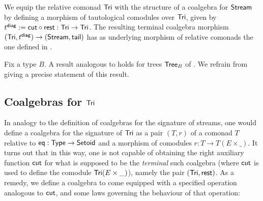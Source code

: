 \documentclass[envcountsame]{llncs}
\begin{document}
\begin{example}
  We equip the relative comonad $\mathsf{Tri}$ with the structure of a coalgebra for $\mathsf{Stream}$ by defining a 
  morphism of tautological comodules over $\mathsf{Tri}$, given by
   $ t^{\mathsf{diag}} := {\mathsf{cut}} \circ {\ensuremath{\mathsf{rest}}}  : \mathsf{Tri} \to \mathsf{Tri}$.
  The resulting terminal coalgebra morphism
   $(\mathsf{Tri}, t^{\mathsf{diag}}) \to (\mathsf{Stream}, \mathsf{tail})$ has as underlying morphism of relative comonads the one defined in .
\end{example}

\begin{Long}
 
\begin{remark}
 Fix a type $B$. A result analogous to  holds for trees $\mathsf{Tree}_B$ of . 
 We refrain from giving a precise statement of this result.
\end{remark}

\end{Long}

\begin{Long}
\subsection{Coalgebras for $\mathsf{Tri}$}
\end{Long}

In analogy to the definition of coalgebras for the signature of streams, one would define
a coalgebra for the signature of $\mathsf{Tri}$ as a pair $(T,r)$ of a comonad $T$ relative to $\mathsf{eq} : \mathsf{Type} \to \mathsf{Setoid}$ and 
a morphism of comodules $r : T \to T(E\times \_)$. 
It turns out that in this way, one is not capable of obtaining the right auxiliary function $\mathsf{cut}$ for what is
supposed to be the \emph{terminal} such coalgebra (where $\mathsf{cut}$ is used to define the comodule $\mathsf{Tri}(E\times \_)$), namely the pair $(\mathsf{Tri},\mathsf{rest})$.
As a remedy, we define a coalgebra to come equipped with a specified operation analogous to $\mathsf{cut}$, and some laws governing
the behaviour of that operation:
\end{document}
